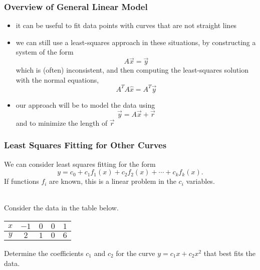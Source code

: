 
\begin{frame}
\frametitle{Overview of General Linear Model }

    \begin{itemize}
        \item<2-> it can be useful to fit data points with curves that are not straight lines
        
        \item<3-> we can still use a least-squares approach in these situations, by constructing a system of the form $$A\vec x = \vec y$$ which is (often) inconsistent, and then computing the least-squares solution with the normal equations, $$A^TA \widehat x = A^T\vec y$$
        
        \item<4-> our approach will be to model the data using $$\vec y = A\vec x + \vec r$$ and to minimize the length of $\vec r$
        
    \end{itemize}

\end{frame}


\begin{frame}\frametitle{Least Squares Fitting for Other Curves} 

    We can consider least squares fitting for the form  \pause 
    \begin{equation*}
    y = c_0 + c_1 f_1  (x) + c_2 f _2 (x) + \cdots + c_k f _{k} (x).  
    \end{equation*}
    \pause 
    If functions $ f _{i}$ are known, this is a linear problem in the $c_i$ variables.

\vspace{12pt} 

 \\
Consider the data in the table below. 
    \vspace{-6pt}
    \begin{center}
        \begin{tabular}{c|cccc} 
            $ x$  & $-1$ & $0$ & $0$ & $1$
            \\ \hline 
            $ y$ & $2$ & $1$ & $0$ & $6$
        \end{tabular}
    \end{center}
    \vspace{-6pt}
    Determine the coefficients $c_1$ and $c_2$ for the curve $y = c_1 x + c_2 x^2$ that best fits the data. 

\end{frame}



